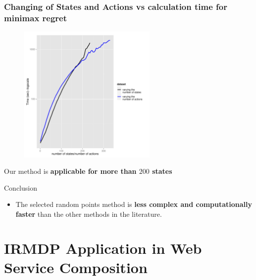 \documentclass{beamer}
\newcommand{\remark}[1]{{\color{blue}{#1}}}
\begin{document}
\begin{frame}\frametitle{Changing of States and Actions vs calculation time for minimax regret}

\begin{figure}
\centering
\includegraphics[width=0.6\textwidth]{images/ourresult.pdf}
  
\end{figure}
Our method is \textbf{applicable for more than $200$ states}

\end{frame}

\begin{frame}{Conclusion}

\remark{minimax regret calculation}
\begin{itemize}
\item The selected random points method is \textbf{less complex and computationally faster} than the other methods in the literature.
\end{itemize}

\end{frame}


\section{IRMDP Application in Web Service Composition}
\end{document}
